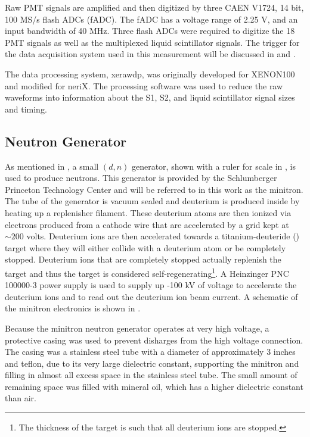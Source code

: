 Raw PMT signals are amplified and then digitized by three CAEN V1724, 14 bit, 100 MS/s flash ADCs (fADC).  The fADC has a voltage range of 2.25 V, and an input bandwidth of 40 MHz.   Three flash ADCs were required to digitize the 18 PMT signals as well as the multiplexed liquid scintillator signals.  The trigger for the data acquisition system used in this measurement will be discussed in  and .

The data processing system, xerawdp, was originally developed for XENON100 \cite{guillaume_thesis} and modified for neriX.  The processing software was used to reduce the raw waveforms into information about the S1, S2, and liquid scintillator signal sizes and timing.  




\subsection{Neutron Generator}

As mentioned in , a small $(d, n)$ generator, shown with a ruler for scale in ,  is used to produce neutrons.  This generator is provided by the Schlumberger Princeton Technology Center and will be referred to in this work as the minitron.  The tube of the generator is vacuum sealed and deuterium is produced inside by heating up a replenisher filament.  These deuterium atoms are then ionized via electrons produced from a cathode wire that are accelerated by a grid kept at $\sim 200$ volts.  Deuterium ions are then accelerated towards a titanium-deuteride () target where they will either collide with a deuterium atom or be completely stopped.  Deuterium ions that are completely stopped actually replenish the target and thus the target is considered self-regenerating\footnote{The thickness of the target is such that all deuterium ions are stopped.}.  A Heinzinger PNC 100000-3 power supply is used to supply up -100 kV of voltage to accelerate the deuterium ions and to read out the deuterium ion beam current.  A schematic of the minitron electronics is shown in .

Because the minitron neutron generator operates at very high voltage, a protective casing was used to prevent disharges from the high voltage connection. The casing was a stainless steel tube with a diameter of approximately 3 inches and teflon, due to its very large dielectric constant, supporting the minitron and filling in almost all excess space in the stainless steel tube.  The small amount of remaining space was filled with mineral oil, which has a higher dielectric constant than air.

